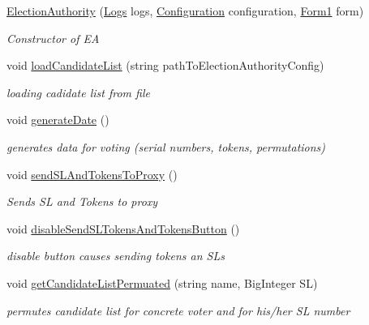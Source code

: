 \begin{DoxyCompactItemize}
\item 
\hyperlink{class_election_authority_1_1_election_authority_a89f48ec7d1263afdadd76a3aa2f4d605}{Election\+Authority} (\hyperlink{class_election_authority_1_1_logs}{Logs} logs, \hyperlink{class_election_authority_1_1_configuration}{Configuration} configuration, \hyperlink{class_election_authority_1_1_form1}{Form1} form)
\begin{DoxyCompactList}\small\item\em Constructor of E\+A \end{DoxyCompactList}\item 
void \hyperlink{class_election_authority_1_1_election_authority_af48efaf2878996d108602169cec9ec18}{load\+Candidate\+List} (string path\+To\+Election\+Authority\+Config)
\begin{DoxyCompactList}\small\item\em loading cadidate list from file \end{DoxyCompactList}\item 
void \hyperlink{class_election_authority_1_1_election_authority_a667063e255f7df060841cc95624a25ad}{generate\+Date} ()
\begin{DoxyCompactList}\small\item\em generates data for voting (serial numbers, tokens, permutations) \end{DoxyCompactList}\item 
void \hyperlink{class_election_authority_1_1_election_authority_a11b2ee561bc38220f0307ad1825c1c6d}{send\+S\+L\+And\+Tokens\+To\+Proxy} ()
\begin{DoxyCompactList}\small\item\em Sends S\+L and Tokens to proxy \end{DoxyCompactList}\item 
void \hyperlink{class_election_authority_1_1_election_authority_a7bfaa19d5fa5df0c6f58722fe84118fa}{disable\+Send\+S\+L\+Tokens\+And\+Tokens\+Button} ()
\begin{DoxyCompactList}\small\item\em disable button causes sending tokens an S\+Ls \end{DoxyCompactList}\item 
void \hyperlink{class_election_authority_1_1_election_authority_a95ac22df9074035ddbea9684624dcc39}{get\+Candidate\+List\+Permuated} (string name, Big\+Integer S\+L)
\begin{DoxyCompactList}\small\item\em permutes candidate list for concrete voter and for his/her S\+L number \end{DoxyCompactList}\item 

\end{DoxyCompactItemize}
